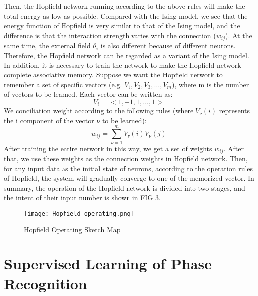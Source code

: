 \documentclass[prl,aps,twocolumn]{revtex4}
\begin{document}
    Then, the Hopfield network running according to the above rules will make the total energy as low as possible. Compared with the Ising model, we see that the energy function of Hopfield is very similar to that of the Ising model, and the difference is that the interaction strength varies with the connection ($w_{ij}$). At the same time, the external field $\theta_i$ is also different because of different neurons. Therefore, the Hopfield network can be regarded as a variant of the Ising model.
    \indent In addition, it is necessary to train the network to make the Hopfield network complete associative memory. Suppose we want the Hopfield network to remember a set of specific vectors (e.g. $V_1, V_2, V_3,\ldots, V_m$), where m is the number of vectors to be learned. Each vector can be written as:
    \begin{equation}
      V_i=<1,-1,1,\ldots,1>
    \end{equation}
    We conciliation weight according to the following rules (where $V_{\nu}(i)$ represents the i component of the vector $\nu$ to be learned):
    \begin{equation}
      w_{ij}=\sum_{\nu=1}^mV_{\nu}(i)V_{\nu}(j)
    \end{equation}
    After training the entire network in this way, we get a set of weights $w_{ij}$. After that, we use these weights as the connection weights in Hopfield network. Then, for any input data as the initial state of neurons, according to the operation rules of Hopfield, the system will gradually converge to one of the memorized vector.
    \indent In summary, the operation of the Hopfield network is divided into two stages, and the intent of their input number is shown in FIG 3.
    \begin{figure}[htb]
      \texttt{[image: Hopfield\_operating.png]}
      \caption{Hopfield Operating Sketch Map}
      \label{fig:3}
    \end{figure}


\section{Supervised Learning of Phase Recognition}
\end{document}
